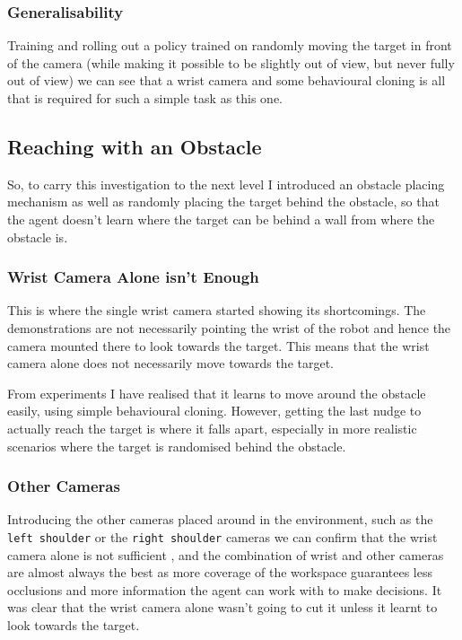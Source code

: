 \subsubsection{Generalisability}
Training and rolling out a policy trained on randomly moving the target in front of the camera (while making it possible to be slightly out of view, but never fully out of view) we can see that a wrist camera and some behavioural cloning is all that is required for such a simple task as this one. 


\subsection{Reaching with an Obstacle}
So, to carry this investigation to the next level I introduced an obstacle placing mechanism as well as randomly placing the target behind the obstacle, so that the agent doesn't learn where the target can be behind a wall from where the obstacle is.

\subsubsection{Wrist Camera Alone isn't Enough}
This is where the single wrist camera started showing its shortcomings. The demonstrations are not necessarily pointing the wrist of the robot and hence the camera mounted there to look towards the target. This means that the wrist camera alone does not necessarily move towards the target.

From experiments I have realised that it learns to move around the obstacle easily, using simple behavioural cloning. However, getting the last nudge to actually reach the target is where it falls apart, especially in more realistic scenarios where the target is randomised behind the obstacle.

\subsubsection{Other Cameras}
Introducing the other cameras placed around in the environment, such as the \verb|left shoulder| or the \verb|right shoulder| cameras we can confirm that the wrist camera alone is not sufficient , and the combination of wrist and other cameras are almost always the best as more coverage of the workspace guarantees less occlusions and more information the agent can work with to make decisions. It was clear that the wrist camera alone wasn't going to cut it unless it learnt to look towards the target.

